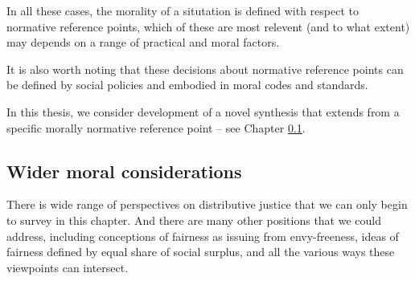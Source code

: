 
In all these cases, the morality of a situtation is defined with respect to normative reference points, which of these are most relevent (and to what extent) may depends on a range of practical and moral factors.

It is also worth noting that these decisions about normative reference points can be defined by social policies %
 and embodied in moral codes and standards.


In this thesis, we consider development of a novel synthesis that extends from a specific morally normative reference point -- see Chapter \ref{}. 


\subsection{Wider moral considerations}

There is wide range of perspectives on distributive justice that we can only begin to survey in this chapter.
And there are many other positions that we could address, including conceptions of fairness as issuing from envy-freeness, ideas of fairness defined by equal share of social surplus, and all the various ways these viewpoints can intersect.%

